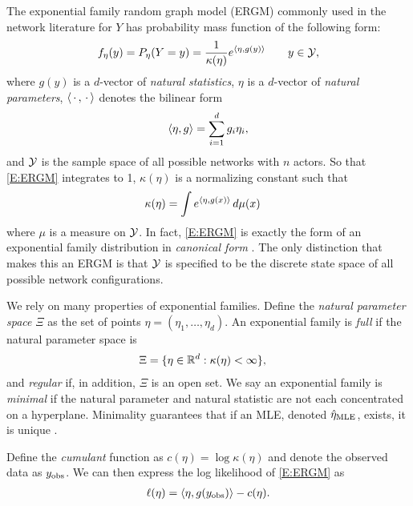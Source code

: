 The exponential family random graph model (ERGM) commonly used in the network 
literature for $Y$ has probability mass function of the following form:
\begin{align}
	f_\eta(y) = P_{\eta}(Y=y) = \frac{1}{ \kappa( \eta) } e^{ \langle  \eta, g(y) \rangle  } \qquad y \in {\mathcal Y}, \label{E:ERGM}
\end{align}
where $g(y)$ is a $d$-vector of \emph{natural statistics}, $\eta$ is a 
$d$-vector of \emph{natural parameters}, 
$\langle \,\cdot\,,\,\cdot\, \rangle$ denotes the bilinear form
\begin{align*}
	\langle  \eta, g  \rangle = \sum_{i=1}^d g_i \eta_i,
\end{align*}
and ${\mathcal Y}$ is the sample space of all possible networks with $n$ actors.
So that \eqref{E:ERGM} integrates to 1, $\kappa(\eta)$ is a normalizing constant such that
\begin{align}
   \kappa(\eta) &= \int e^{ \langle  \eta, g(x) \rangle  } \, d \mu(x) \label{E:kappa}
\end{align}
where $\mu$ is a measure on ${\mathcal Y}$.  In fact, \eqref{E:ERGM} is exactly the form of 
an exponential family distribution in \emph{canonical form} \citep[Chapter 1.4]{tpe}.  The only distinction that makes this an ERGM is that ${\mathcal Y}$ is specified to be the 
discrete state space of all possible network configurations.

We rely on many properties of exponential families.  Define 
the \emph{natural parameter space} $\Xi$ as the set of points
$\eta = (\eta_1, \ldots, \eta_d)$.
An exponential family is \emph{full} if the natural parameter  space is
\begin{align*} %
   \Xi &= \{ \eta \in \RR^d : \kappa(\eta) < \infty \},  
\end{align*}
 and \emph{regular} if, in addition, $\Xi$ is an open set.
We say an exponential family is \emph{minimal} if the natural parameter  and 
natural statistic are not each concentrated on a hyperplane. 
Minimality guarantees that if an MLE, denoted $\hat{\eta}_{\textrm{MLE}}$, exists, 
it is unique \citep{Geyer:gdor}.


Define the \emph{cumulant} function as $c(\eta) = \log \kappa(\eta)$ and
denote the observed data as $y_{\text{obs}}$.  We can then express 
the log likelihood of \eqref{E:ERGM} as
\begin{align}
	\ell( \eta ) = \langle  \eta, g(y_{\text{obs}}) \rangle - c( \eta). \label{E:loglike}
\end{align}

